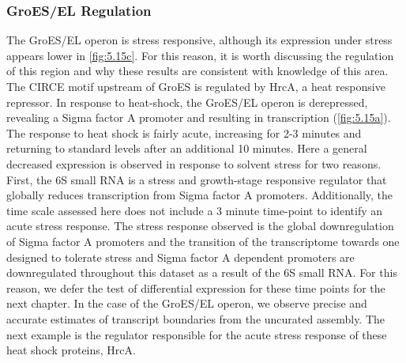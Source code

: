 \subsubsection{GroES/EL Regulation}
The GroES/EL operon is stress responsive, although its expression under stress appears lower in \ref{fig:5.15c}. For this reason, it is worth discussing the regulation of this region and why these results are consistent with knowledge of this area. The CIRCE motif upstream of GroES is regulated by HrcA, a heat responsive repressor\cite{42,77,78}. In response to heat-shock, the GroES/EL operon is derepressed, revealing a Sigma factor A promoter and resulting in transcription (\ref{fig:5.15a}). The response to heat shock is fairly acute, increasing for 2-3 minutes and returning to standard levels after an additional 10 minutes\cite{77}. Here a general decreased expression is observed in response to solvent stress for two reasons. First, the 6S small RNA is a stress and growth-stage responsive regulator that globally reduces transcription from Sigma factor A promoters\cite{39,79}. Additionally, the time scale assessed here does not include a 3 minute time-point to identify an acute stress response. The stress response observed is the global downregulation of Sigma factor A promoters and the transition of the transcriptome towards one designed to tolerate stress and Sigma factor A dependent promoters are downregulated throughout this dataset as a result of the 6S small RNA. For this reason, we defer the test of differential expression for these time points for the next chapter. In the case of the GroES/EL operon, we observe precise and accurate estimates of transcript boundaries from the uncurated assembly. The next example is the regulator responsible for the acute stress response of these heat shock proteins, HrcA.


